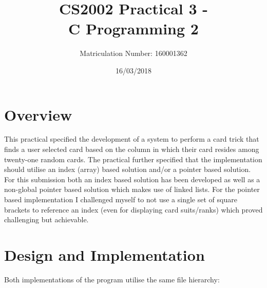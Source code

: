 \documentclass[11]{article}
\title{CS2002 Practical 3 - \\C Programming 2}
\date{16/03/2018}
\author{Matriculation Number: 160001362}
\begin{document}
	\maketitle
	\newpage
	\tableofcontents
	
	\newpage
	\section{Overview}
	This practical specified the development of a system to perform a card trick that finds a user selected card based on the column in which their card resides among twenty-one random cards. The practical further specified that the implementation should utilise an index (array) based solution and/or a pointer based solution. For this submission both an index based solution has been developed as well as a non-global pointer based solution which makes use of linked lists. For the pointer based implementation I challenged myself to not use a single set of square brackets to reference an index (even for displaying card suits/ranks) which proved challenging but achievable.
	\section{Design and Implementation}
		Both implementations of the program utilise the same file hierarchy:
\end{document}
